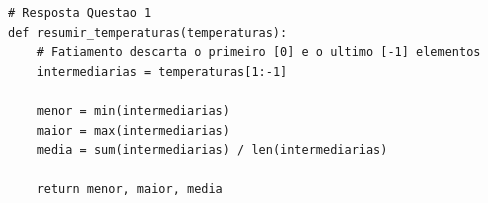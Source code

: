 \ifmostrarGabarito
\begin{verbatim}
# Resposta Questao 1
def resumir_temperaturas(temperaturas):
    # Fatiamento descarta o primeiro [0] e o ultimo [-1] elementos
    intermediarias = temperaturas[1:-1]
    
    menor = min(intermediarias)
    maior = max(intermediarias)
    media = sum(intermediarias) / len(intermediarias)
    
    return menor, maior, media
\end{verbatim}
\fi
